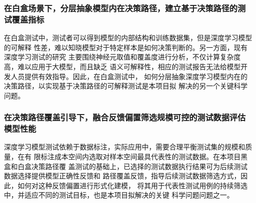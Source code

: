 \subsubsection{在白盒场景下，分层抽象模型内在决策路径，建立基于决策路径的测试覆盖指标}

在白盒测试中，测试者可以得到模型的内部结构和训练数据集，但是深度学习模型的可解释
性差，难以知晓模型对于特定样本是如何决策判断的。另一方面，现有深度学习测试的研究
主要围绕神经元取值和覆盖度进行分析，不仅计算复杂度高，难以应用于大模型，而且缺乏
语义可解释性，相应的测试报告无法给模型开发人员提供有效指导。因此，在白盒测试中，
如何分层抽象深度学习模型内在的决策路径，以实现基于决策路径的可解释测试是本项目拟
解决的另一个关键科学问题。

\subsubsection{在决策路径覆盖引导下，融合反馈偏置筛选规模可控的测试数据评估模型性能}

深度学习模型测试依赖于数据标注，实际应用中，需要合理平衡测试集的规模和质量，在有
限标注成本空间内选取对样本空间最具代表性的测试数据。在本项目黑盒和白盒决策路径覆
盖测试的基础上，已选择的测试数据执行结果可为后续测试数据选择提供模型正确性反馈和
路径覆盖反馈，指导后续测试数据筛选方式，因此，如何对这种反馈偏置进行形式化建模，
将其用于代表性测试用例的持续筛选中，并适应不同的测试目标，也是本项目拟解决的关键
科学问题问题之一。